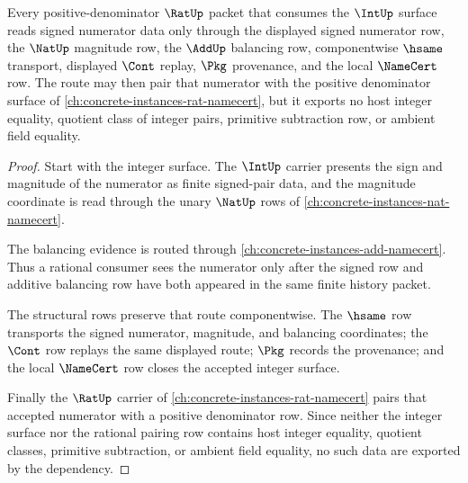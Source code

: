 \begin{theorem}
\label{thm:int-rat-signed-numerator-route}
Every positive-denominator $\RatUp$ packet that consumes the $\IntUp$ surface reads signed numerator data only through the displayed signed numerator row, the $\NatUp$ magnitude row, the $\AddUp$ balancing row, componentwise $\hsame$ transport, displayed $\Cont$ replay, $\Pkg$ provenance, and the local $\NameCert$ row. The route may then pair that numerator with the positive denominator surface of \autoref{ch:concrete-instances-rat-namecert}, but it exports no host integer equality, quotient class of integer pairs, primitive subtraction row, or ambient field equality.
\end{theorem}
\begin{proof}
Start with the integer surface. The $\IntUp$ carrier presents the sign and magnitude of the numerator as finite signed-pair data, and the magnitude coordinate is read through the unary $\NatUp$ rows of \autoref{ch:concrete-instances-nat-namecert}.

The balancing evidence is routed through \autoref{ch:concrete-instances-add-namecert}. Thus a rational consumer sees the numerator only after the signed row and additive balancing row have both appeared in the same finite history packet.

The structural rows preserve that route componentwise. The $\hsame$ row transports the signed numerator, magnitude, and balancing coordinates; the $\Cont$ row replays the same displayed route; $\Pkg$ records the provenance; and the local $\NameCert$ row closes the accepted integer surface.

Finally the $\RatUp$ carrier of \autoref{ch:concrete-instances-rat-namecert} pairs that accepted numerator with a positive denominator row. Since neither the integer surface nor the rational pairing row contains host integer equality, quotient classes, primitive subtraction, or ambient field equality, no such data are exported by the dependency.
\end{proof}
